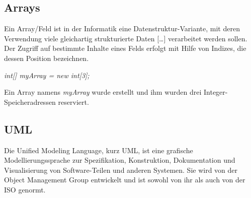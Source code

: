 \documentclass[12pt,a4paper]{article}
\begin{document}
\subsection{Arrays}
    Ein Array/Feld ist in der Informatik eine Datenstruktur-Variante, mit deren Verwendung viele gleichartig strukturierte Daten […] verarbeitet werden sollen. Der Zugriff auf bestimmte Inhalte eines Felds erfolgt mit Hilfe von Indizes, die dessen Position bezeichnen.
    \begin{center}
        \textit{int[] myArray = new int[3];}
    \end{center}
    Ein Array namens \textit{myArray} wurde erstellt und ihm wurden drei Integer-Speicheradressen reserviert.

\subsection{UML}
    Die Unified Modeling Language, kurz UML, ist eine grafische Modellierungssprache zur Spezifikation, Konstruktion, Dokumentation und Visualisierung von Software-Teilen und anderen Systemen. Sie wird von der Object Management Group entwickelt und ist sowohl von ihr als auch von der ISO genormt.
\end{document}

